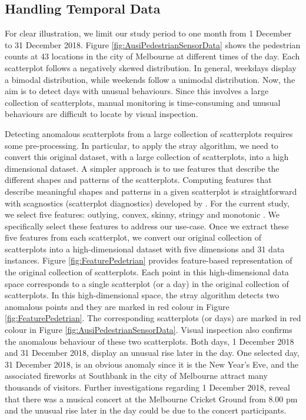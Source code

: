 \documentclass[11pt,a4paper,]{article}
\theoremstyle{definition}
\theoremstyle{definition}
\theoremstyle{definition}
\theoremstyle{remark}
\begin{document}
\hypertarget{handling-temporal-data}{%
\subsection{Handling Temporal Data}\label{handling-temporal-data}}

For clear illustration, we limit our study period to one month from 1 December to 31 December 2018. Figure \ref{fig:AusiPedestrianSensorData} shows the pedestrian counts at 43 locations in the city of Melbourne at different times of the day. Each scatterplot follows a negatively skewed distribution. In general, weekdays display a bimodal distribution, while weekends follow a unimodal distribution. Now, the aim is to detect days with unusual behaviours. Since this involves a large collection of scatterplots, manual monitoring is time-consuming and unusual behaviours are difficult to locate by visual inspection.

Detecting anomalous scatterplots from a large collection of scatterplots requires some pre-processing. In particular, to apply the stray algorithm, we need to convert this original dataset, with a large collection of scatterplots, into a high dimensional dataset. A simpler approach is to use features that describe the different shapes and patterns of the scatterplots. Computing features that describe meaningful shapes and patterns in a given scatterplot is straightforward with scagnostics (scatterplot diagnostics) developed by \textcite{wilkinson2005graph}. For the current study, we select five features: outlying, convex, skinny, stringy and monotonic \autocite{dang2014transforming,wilkinson2005graph}. We specifically select these features to address our use-case. Once we extract these five features from each scatterplot, we convert our original collection of scatterplots into a high-dimensional dataset with five dimensions and 31 data instances. Figure \ref{fig:FeaturePedetrian} provides feature-based representation of the original collection of scatterplots. Each point in this high-dimensional data space corresponds to a single scatterplot (or a day) in the original collection of scatterplots. In this high-dimensional space, the stray algorithm detects two anomalous points and they are marked in red colour in Figure \ref{fig:FeaturePedetrian}. The corresponding scatterplots (or days) are marked in red colour in Figure \ref{fig:AusiPedestrianSensorData}. Visual inspection also confirms the anomalous behaviour of these two scatterplots. Both days, 1 December 2018 and 31 December 2018, display an unusual rise later in the day. One selected day, 31 December 2018, is an obvious anomaly since it is the New Year's Eve, and the associated fireworks at Southbank in the city of Melbourne attract many thousands of visitors. Further investigations regarding 1 December 2018, reveal that there was a musical concert at the Melbourne Cricket Ground from 8.00 pm and the unusual rise later in the day could be due to the concert participants.
\end{document}
